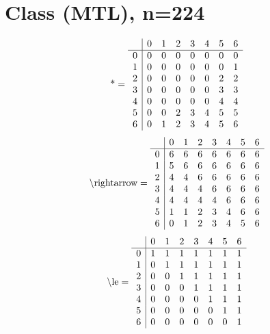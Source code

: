 \documentclass[11pt]{article}
\begin{document}
\section{Class (MTL), n=224}
\[\text{*} = 
\begin{array}{r | r r r r r r r}
 & 0 & 1 & 2 & 3 & 4 & 5 & 6 \\ \hline
0 & 0 & 0 & 0 & 0 & 0 & 0 & 0 \\
1 & 0 & 0 & 0 & 0 & 0 & 0 & 1 \\
2 & 0 & 0 & 0 & 0 & 0 & 2 & 2 \\
3 & 0 & 0 & 0 & 0 & 0 & 3 & 3 \\
4 & 0 & 0 & 0 & 0 & 0 & 4 & 4 \\
5 & 0 & 0 & 2 & 3 & 4 & 5 & 5 \\
6 & 0 & 1 & 2 & 3 & 4 & 5 & 6 \\
\end{array}
\]
\[\text{\textbackslash rightarrow} = 
\begin{array}{r | r r r r r r r}
 & 0 & 1 & 2 & 3 & 4 & 5 & 6 \\ \hline
0 & 6 & 6 & 6 & 6 & 6 & 6 & 6 \\
1 & 5 & 6 & 6 & 6 & 6 & 6 & 6 \\
2 & 4 & 4 & 6 & 6 & 6 & 6 & 6 \\
3 & 4 & 4 & 4 & 6 & 6 & 6 & 6 \\
4 & 4 & 4 & 4 & 4 & 6 & 6 & 6 \\
5 & 1 & 1 & 2 & 3 & 4 & 6 & 6 \\
6 & 0 & 1 & 2 & 3 & 4 & 5 & 6 \\
\end{array}
\]
\[\text{\textbackslash le} = 
\begin{array}{r | r r r r r r r}
 & 0 & 1 & 2 & 3 & 4 & 5 & 6 \\ \hline
0 & 1 & 1 & 1 & 1 & 1 & 1 & 1 \\
1 & 0 & 1 & 1 & 1 & 1 & 1 & 1 \\
2 & 0 & 0 & 1 & 1 & 1 & 1 & 1 \\
3 & 0 & 0 & 0 & 1 & 1 & 1 & 1 \\
4 & 0 & 0 & 0 & 0 & 1 & 1 & 1 \\
5 & 0 & 0 & 0 & 0 & 0 & 1 & 1 \\
6 & 0 & 0 & 0 & 0 & 0 & 0 & 1 \\
\end{array}
\]
\end{document}
